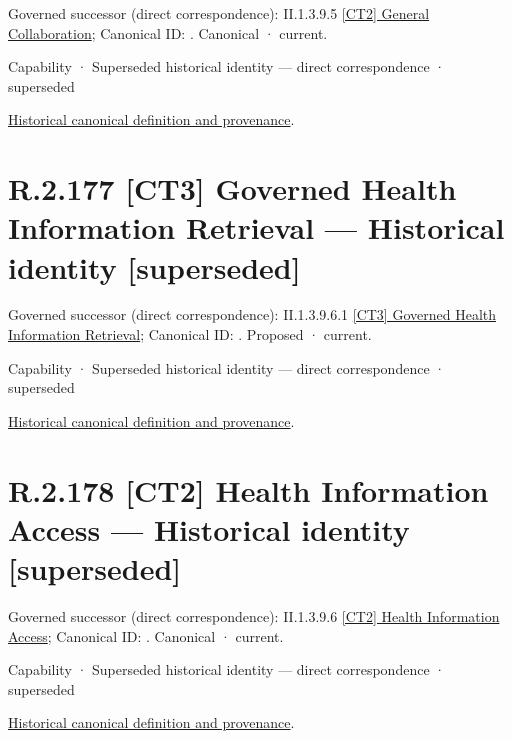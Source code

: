 {\small Governed successor (direct correspondence): II.1.3.9.5 \hyperref[element:3bb740e6db284112b054905c0c6c80be]{[CT2] General Collaboration}; Canonical ID: \texttt{}. Canonical · current.}\par
\label{element:4f58c82aca7a4b54aeb6e2920ce5c12a}
{\small Capability · Superseded historical identity — direct correspondence · superseded}\par
\href{../../../../../../../continuum/strategy/capability/4f58c82aca7a4b54aeb6e2920ce5c12a.md}{Historical canonical definition and provenance}.\par
\section*{R.2.177 [CT3] Governed Health Information Retrieval — Historical identity [superseded]}
\label{navigation:R.2.177}

{\small Governed successor (direct correspondence): II.1.3.9.6.1 \hyperref[element:76e74e46ca4d44a1a7bb116b358f231c]{[CT3] Governed Health Information Retrieval}; Canonical ID: \texttt{}. Proposed · current.}\par
\label{element:90b838d703dd472b8b6d74961f3a748c}
{\small Capability · Superseded historical identity — direct correspondence · superseded}\par
\href{../../../../../../../continuum/strategy/capability/90b838d703dd472b8b6d74961f3a748c.md}{Historical canonical definition and provenance}.\par
\section*{R.2.178 [CT2] Health Information Access — Historical identity [superseded]}
\label{navigation:R.2.178}

{\small Governed successor (direct correspondence): II.1.3.9.6 \hyperref[element:cc253aea3c5f489da0502df74dde1669]{[CT2] Health Information Access}; Canonical ID: \texttt{}. Canonical · current.}\par
\label{element:5019ae9f2cdc45a1b2de97bc0f5a313d}
{\small Capability · Superseded historical identity — direct correspondence · superseded}\par
\href{../../../../../../../continuum/strategy/capability/5019ae9f2cdc45a1b2de97bc0f5a313d.md}{Historical canonical definition and provenance}.\par
